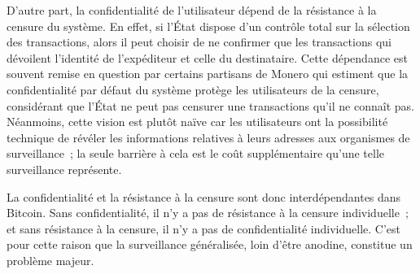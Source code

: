 D'autre part, la confidentialité de l'utilisateur dépend de la résistance à la censure du système. En effet, si l'État dispose d'un contrôle total sur la sélection des transactions, alors il peut choisir de ne confirmer que les transactions qui dévoilent l'identité de l'expéditeur et celle du destinataire. Cette dépendance est souvent remise en question par certains partisans de Monero qui estiment que la confidentialité par défaut du système protège les utilisateurs de la censure, considérant que l'État ne peut pas censurer une transactions qu'il ne connaît pas. Néanmoins, cette vision est plutôt naïve car les utilisateurs ont la possibilité technique de révéler les informations relatives à leurs adresses aux organismes de surveillance~; la seule barrière à cela est le coût supplémentaire qu'une telle surveillance représente. %

La confidentialité et la résistance à la censure sont donc interdépendantes dans Bitcoin. Sans confidentialité, il n'y a pas de résistance à la censure individuelle~; et sans résistance à la censure, il n'y a pas de confidentialité individuelle. C'est pour cette raison que la surveillance généralisée, loin d'être anodine, constitue un problème majeur.

